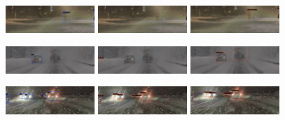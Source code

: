 \documentclass[report.tex]{subfiles}
\begin{document}
    \begin{figure}[h!]
        \centering
        \includegraphics[width=0.3\textwidth]{images/results/hrfuser_vs_mtdetr/samples/dense_fgo_night/2018-02-07_18-26-13_00240.png}
        \includegraphics[width=0.3\textwidth]{images/results/hrfuser_vs_mtdetr/samples/dense_fgo_night/2018-02-07_18-26-13_00240_former.png}
        \includegraphics[width=0.3\textwidth]{images/results/hrfuser_vs_mtdetr/samples/dense_fgo_night/2018-02-07_18-26-13_00240_m_cropped.png}

        \includegraphics[width=0.3\textwidth]{images/results/hrfuser_vs_mtdetr/samples/dense_fog/2019-01-09_11-02-41_00660.png}
        \includegraphics[width=0.3\textwidth]{images/results/hrfuser_vs_mtdetr/samples/dense_fog/2019-01-09_11-02-41_00660_former.png}
        \includegraphics[width=0.3\textwidth]{images/results/hrfuser_vs_mtdetr/samples/dense_fog/2019-01-09_11-02-41_00660_m_cropped.png}

        \includegraphics[width=0.3\textwidth]{images/results/hrfuser_vs_mtdetr/samples/night_snow/2018-02-12_18-05-56_00060.png}
        \includegraphics[width=0.3\textwidth]{images/results/hrfuser_vs_mtdetr/samples/night_snow/2018-02-12_18-05-56_00060_former.png}
        \includegraphics[width=0.3\textwidth]{images/results/hrfuser_vs_mtdetr/samples/night_snow/2018-02-12_18-05-56_00060_m_cropped.png}


\end{figure}
\end{document}
